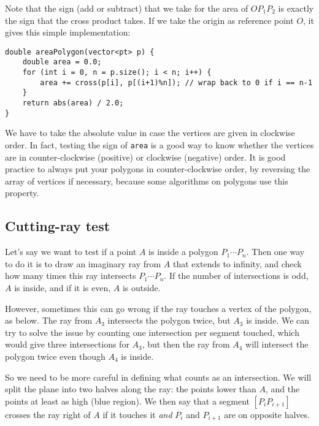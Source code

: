 Note that the sign (add or subtract) that we take for the area of $OP_1P_2$ is exactly the sign that the cross product takes. If we take the origin as reference point $O$, it gives this simple implementation:
\begin{lstlisting}
double areaPolygon(vector<pt> p) {
    double area = 0.0;
    for (int i = 0, n = p.size(); i < n; i++) {
        area += cross(p[i], p[(i+1)%n]); // wrap back to 0 if i == n-1
    }
    return abs(area) / 2.0;
}
\end{lstlisting}
We have to take the absolute value in case the vertices are given in clockwise order. In fact, testing the sign of \lstinline|area| is a good way to know whether the vertices are in counter-clockwise (positive) or clockwise (negative) order. It is good practice to always put your polygons in counter-clockwise order, by reversing the array of vertices if necessary, because some algorithms on polygons use this property.

\subsection{Cutting-ray test}
Let's say we want to test if a point $A$ is inside a polygon $P_1 \cdots P_n$. Then one way to do it is to draw an imaginary ray from $A$ that extends to infinity, and check how many times this ray intersects $P_1 \cdots P_n$. If the number of intersections is odd, $A$ is inside, and if it is even, $A$ is outside.


However, sometimes this can go wrong if the ray touches a vertex of the polygon, as below. The ray from $A_3$ intersects the polygon twice, but $A_3$ is inside. We can try to solve the issue by counting one intersection per segment touched, which would give three intersections for $A_3$, but then the ray from $A_4$ will intersect the polygon twice even though $A_4$ is inside.


So we need to be more careful in defining what counts as an intersection. We will split the plane into two halves along the ray: the points lower than $A$, and the points at least as high (blue region). We then say that a segment $[P_iP_{i+1}]$ crosses the ray right of $A$ if it touches it \emph{and} $P_i$ and $P_{i+1}$ are on opposite halves.

